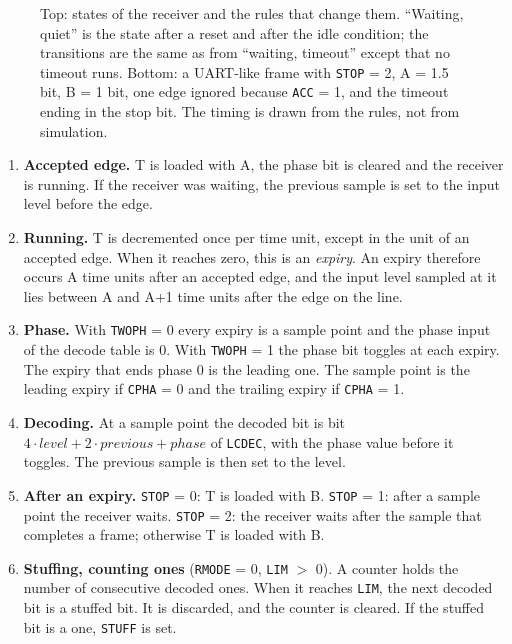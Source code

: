 \documentclass[10pt,a4paper]{article}
\newcommand{\reg}[1]{\texttt{#1}}
\begin{document}
\begin{figure}[!htb]
\centering
\resizebox{\textwidth}{!}{}
\caption{Top: states of the receiver and the rules that change them. ``Waiting, quiet'' is the state after a reset
and after the idle condition; the transitions are the same as from ``waiting, timeout'' except that no timeout
runs. Bottom: a UART-like frame with \reg{STOP} = 2, A = 1.5 bit, B = 1 bit, one edge ignored because
\reg{ACC} = 1, and the timeout ending in the stop bit. The timing is drawn from the rules, not from simulation.}
\label{fig:rxstate}
\end{figure}

\begin{enumerate}[label=\textbf{R\arabic*},leftmargin=2.6em]
\item \textbf{Accepted edge.} T is loaded with A, the phase bit is cleared and the receiver is running. If the
receiver was waiting, the previous sample is set to the input level before the edge.
\item \textbf{Running.} T is decremented once per time unit, except in the unit of an accepted edge. When it
reaches zero, this is an \emph{expiry}. An expiry therefore occurs A time units after an accepted edge, and the
input level sampled at it lies between A and A+1 time units after the edge on the line.
\item \textbf{Phase.} With \reg{TWOPH} = 0 every expiry is a sample point and the phase input of the decode table is
0. With \reg{TWOPH} = 1 the phase bit toggles at each expiry. The expiry that ends phase 0 is the leading one. The
sample point is the leading expiry if \reg{CPHA} = 0 and the trailing expiry if \reg{CPHA} = 1.
\item \textbf{Decoding.} At a sample point the decoded bit is bit $4\cdot\mathit{level} + 2\cdot\mathit{previous} +
\mathit{phase}$ of \reg{LCDEC}, with the phase value before it toggles. The previous sample is then set to the
level.
\item \textbf{After an expiry.} \reg{STOP} = 0: T is loaded with B. \reg{STOP} = 1: after a sample point the receiver
waits. \reg{STOP} = 2: the receiver waits after the sample that completes a frame; otherwise T is loaded with B.
\item \textbf{Stuffing, counting ones} (\reg{RMODE} = 0, \reg{LIM} $>$ 0). A counter holds the number of consecutive
decoded ones. When it reaches \reg{LIM}, the next decoded bit is a stuffed bit. It is discarded, and the counter
is cleared. If the stuffed bit is a one, \reg{STUFF} is set.

\end{enumerate}
\end{document}
